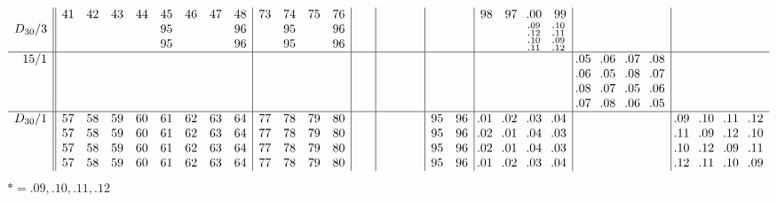 \documentclass[12pt,a4paper]{amsart}
\begin{document}
\begin{align*}
\begin{array}{r||cccccccc|cccc|cc|cccc|cc|cccc|cccc|cccc}
&
41&42&43&44&45&46&47&48&73&74&75&76&  &  &  &  &  &  &  &  &98&97&\llap{.}00&99&&&&&&&&\\
D_{30}/3&
  &  &  &  &95&  &  &96&  &95&  &96&  &  &  &  &  &  &  &  &  &  &^{\llap{.}09}_{\llap{.}12}&^{\llap{.}10}_{\llap{.}11}&&&&&&&&\\
&
  &  &  &  &95&  &  &96&  &95&  &96&  &  &  &  &  &  &  &  &  &  &^{\llap{.}10}_{\llap{.}11}&^{\llap{.}09}_{\llap{.}12}&&&&&&&&\\ \hline
15/1&
  &  &  &  &  &  &  &  &  &  &  &  &  &  &  &  &  &  &  &  &  &  &  &  &\llap{.}05&\llap{.}06&\llap{.}07&\llap{.}08&&&&\\
&
  &  &  &  &  &  &  &  &  &  &  &  &  &  &  &  &  &  &  &  &  &  &  &  &\llap{.}06&\llap{.}05&\llap{.}08&\llap{.}07&&&&\\
&
  &  &  &  &  &  &  &  &  &  &  &  &  &  &  &  &  &  &  &  &  &  &  &  &\llap{.}08&\llap{.}07&\llap{.}05&\llap{.}06&&&&\\
&
  &  &  &  &  &  &  &  &  &  &  &  &  &  &  &  &  &  &  &  &  &  &  &  &\llap{.}07&\llap{.}08&\llap{.}06&\llap{.}05&&&&\\ \hline
D_{30}/1&
57&58&59&60&61&62&63&64&77&78&79&80&  &  &  &  &  &  &95&96&\llap{.}01&\llap{.}02&\llap{.}03&\llap{.}04&  &  &  &  &\llap{.}09&\llap{.}10&\llap{.}11&\llap{.}12\\
&
57&58&59&60&61&62&63&64&77&78&79&80&  &  &  &  &  &  &95&96&\llap{.}02&\llap{.}01&\llap{.}04&\llap{.}03&  &  &  &  &\llap{.}11&\llap{.}09&\llap{.}12&\llap{.}10\\
&
57&58&59&60&61&62&63&64&77&78&79&80&  &  &  &  &  &  &95&96&\llap{.}02&\llap{.}01&\llap{.}04&\llap{.}03&  &  &  &  &\llap{.}10&\llap{.}12&\llap{.}09&\llap{.}11\\
&
57&58&59&60&61&62&63&64&77&78&79&80&  &  &  &  &  &  &95&96&\llap{.}01&\llap{.}02&\llap{.}03&\llap{.}04&  &  &  &  &\llap{.}12&\llap{.}11&\llap{.}10&\llap{.}09\\
\end{array}
\end{align*}
$* = {.}09,{.}10,{.}11,{.}12$

\end{document}
